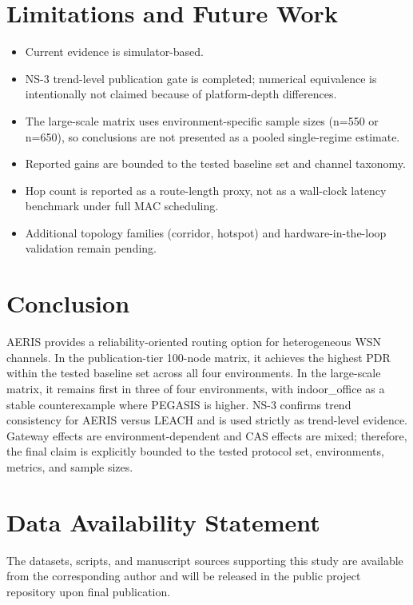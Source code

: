 ﻿\documentclass[sensors,article,submit,moreauthors,pdftex]{Definitions/mdpi}
\begin{document}
\section{Limitations and Future Work}
\begin{itemize}
\item Current evidence is simulator-based.
\item NS-3 trend-level publication gate is completed; numerical equivalence is intentionally not claimed because of platform-depth differences.
\item The large-scale matrix uses environment-specific sample sizes (n=550 or n=650), so conclusions are not presented as a pooled single-regime estimate.
\item Reported gains are bounded to the tested baseline set and channel taxonomy.
\item Hop count is reported as a route-length proxy, not as a wall-clock latency benchmark under full MAC scheduling.
\item Additional topology families (corridor, hotspot) and hardware-in-the-loop validation remain pending.
\end{itemize}

\section{Conclusion}
AERIS provides a reliability-oriented routing option for heterogeneous WSN channels. In the publication-tier 100-node matrix, it achieves the highest PDR within the tested baseline set across all four environments. In the large-scale matrix, it remains first in three of four environments, with indoor\_office as a stable counterexample where PEGASIS is higher. NS-3 confirms trend consistency for AERIS versus LEACH and is used strictly as trend-level evidence. Gateway effects are environment-dependent and CAS effects are mixed; therefore, the final claim is explicitly bounded to the tested protocol set, environments, metrics, and sample sizes.

\section*{Data Availability Statement}
The datasets, scripts, and manuscript sources supporting this study are available from the corresponding author and will be released in the public project repository upon final publication.


\end{document}
